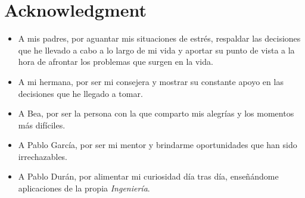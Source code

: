 
\chapter{Acknowledgment}

\begin{itemize}

\item A mis padres, por aguantar mis situaciones de estrés, respaldar las decisiones que he llevado a cabo a lo largo de mi vida y aportar su punto de vista a la hora de afrontar los problemas que surgen en la vida.
\item A mi hermana, por ser mi consejera y mostrar su constante apoyo en las decisiones que he llegado a tomar.
\item A Bea, por ser la persona con la que comparto mis alegrías y los momentos más difíciles.
\item A Pablo García, por ser mi mentor y brindarme oportunidades que han sido irrechazables.
\item A Pablo Durán, por alimentar mi curiosidad día tras día, enseñándome aplicaciones de la propia \textit{Ingeniería}.

\end{itemize}